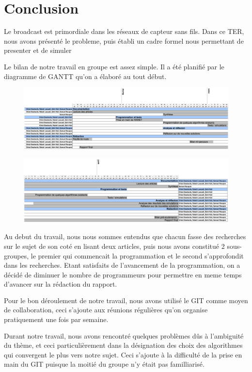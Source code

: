 \chapter{Conclusion}\label{conclusion}

Le broadcast est primordiale dans les réseaux de capteur sans fils. Dans ce TER, nous avons présenté le probleme, puis établi un cadre 
formel nous permettant de presenter et de simuler 



Le bilan de notre travail en groupe est assez simple. Il a été planifié par le diagramme de GANTT qu'on a élaboré au tout début.

\begin{landscape}

\begin{figure}
\centering
\includegraphics[scale=0.98]{Conclusion/diagramme}
\end{figure}

\begin{figure}
\centering
\includegraphics[scale=0.98]{Conclusion/diagramme2}
\end{figure}

\end{landscape}

Au debut du travail, nous nous sommes entendus que chacun fasse des recherches sur le sujet de son coté en lisant 
deux articles, puis nous avons constitué 2 sous-groupes, le premier qui commencait la programmation et le second 
s'approfondit dans les recherches. Etant satisfaits de l'avancement de la programmation, on a décidé de diminuer 
le nombre de programmeurs pour permettre en meme temps d'avancer sur la rédaction du rapport.

Pour le bon déroulement de notre travail, nous avons utilisé le GIT comme moyen de collaboration, ceci s'ajoute 
aux réunions régulières qu'on organise pratiquement une fois par semaine.

Durant notre travail, nous avons rencontré quelques problèmes dûs à l'ambiguité du thème, et ceci particulièrement
dans la désignation des choix des algorithmes qui convergent le plus vers notre sujet. Ceci s'ajoute à la difficulté 
de la prise en main du GIT puisque la moitié du groupe n'y était pas familliarisé.